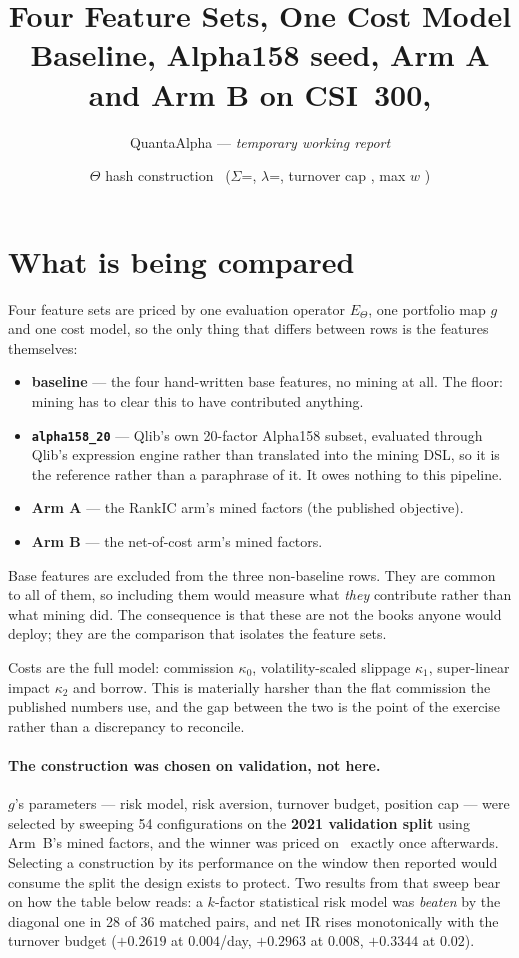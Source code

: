 \documentclass[11pt,a4paper]{article}
\title{\vspace{-1.5em}\textbf{Four Feature Sets, One Cost Model}\\[0.2em]
       \large Baseline, Alpha158 seed, Arm A and Arm B on CSI~300, \WindowFW}
\author{QuantaAlpha --- \emph{temporary working report}}
\date{$\Theta$ hash \texttt{\ThetaHashFW} \quad construction \ConstructionFW\
      ($\Sigma$=\CovFW, $\lambda$=\LamFW, turnover cap \CapFW, max $w$ \MaxWFW)}
\newcommand{\Etheta}{E_{\Theta}}
\begin{document}
\maketitle
\vspace{-1em}

\section{What is being compared}

Four feature sets are priced by one evaluation operator $\Etheta$, one portfolio
map $g$ and one cost model, so the only thing that differs between rows is the
features themselves:

\begin{itemize}\itemsep1pt\parskip0pt
  \item \textbf{baseline} --- the four hand-written base features, no mining at
        all. The floor: mining has to clear this to have contributed anything.
  \item \textbf{\texttt{alpha158\_20}} --- Qlib's own 20-factor Alpha158 subset,
        evaluated through Qlib's expression engine rather than translated into
        the mining DSL, so it is the reference rather than a paraphrase of it.
        It owes nothing to this pipeline.
  \item \textbf{Arm A} --- the RankIC arm's mined factors (the published
        objective).
  \item \textbf{Arm B} --- the net-of-cost arm's mined factors.
\end{itemize}

Base features are excluded from the three non-baseline rows. They are common to
all of them, so including them would measure what \emph{they} contribute rather
than what mining did. The consequence is that these are not the books anyone
would deploy; they are the comparison that isolates the feature sets.

Costs are the full model: commission $\kappa_0$, volatility-scaled slippage
$\kappa_1$, super-linear impact $\kappa_2$ and borrow. This is materially
harsher than the flat commission the published numbers use, and the gap between
the two is the point of the exercise rather than a discrepancy to reconcile.

\paragraph{The construction was chosen on validation, not here.}
$g$'s parameters --- risk model, risk aversion, turnover budget, position cap
--- were selected by sweeping 54 configurations on the \textbf{2021 validation
split} using Arm~B's mined factors, and the winner was priced on
\WindowFW\ exactly once afterwards. Selecting a construction by its performance
on the window then reported would consume the split the design exists to
protect. Two results from that sweep bear on how the table below reads: a
$k$-factor statistical risk model was \emph{beaten} by the diagonal one in 28 of
36 matched pairs, and net IR rises monotonically with the turnover budget
($+0.2619$ at $0.004$/day, $+0.2963$ at $0.008$, $+0.3344$ at $0.02$).
\end{document}

